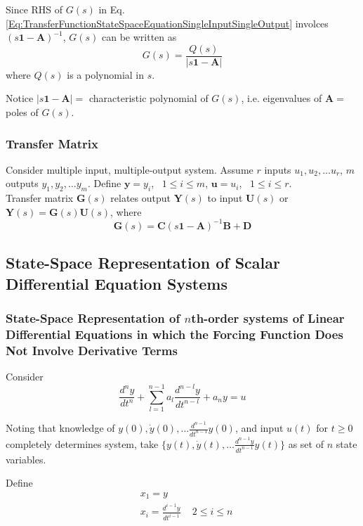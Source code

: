 \documentclass[10pt]{amsart}
\begin{document}
\begin{multicols*}{2}
Since RHS of $G(s)$ in Eq. \ref{Eq:TransferFunctionStateSpaceEquationSingleInputSingleOutput} involces $(s\mathbf{1} - \mathbf{A})^{-1}$, $G(s)$ can be written as 
\[
G(s) = \frac{Q(s)}{ |s\mathbf{1} - \mathbf{A} | } 
\]
where $Q(s)$ is a polynomial in $s$. 

Notice $|s\mathbf{1}- \mathbf{A}| = $ characteristic polynomial of $G(s)$, i.e. eigenvalues of $\mathbf{A} = $ poles of $G(s)$.

\subsubsection{Transfer Matrix}

Consider multiple input, multiple-output system. Assume $r$ inputs $u_1, u_2, \dots u_r$, $m$ outputs $y_1, y_2, \dots y_m$.  Define $\mathbf{y} = y_i$, \quad \, $1\leq i \leq m$, $\mathbf{u} = u_i$, \quad \, $1 \leq i \leq r$. \\

Transfer matrix $\mathbf{G}(s)$ relates output $\mathbf{Y}(s)$ to input $\mathbf{U}(s)$ or $\mathbf{Y}(s) = \mathbf{G}(s) \mathbf{U}(s)$, where
\begin{equation}
\mathbf{G}(s) = \mathbf{C} (s\mathbf{1} - \mathbf{A})^{-1} \mathbf{B} + \mathbf{D}
\end{equation}

\subsection{State-Space Representation of Scalar Differential Equation Systems}

\subsubsection{State-Space Representation of $n$th-order systems of Linear Differential Equations in which the Forcing Function Does Not Involve Derivative Terms}

Consider 
\begin{equation}
\frac{d^ny}{dt^n} + \sum_{l=1}^{n-1} a_l \frac{d^{n-l} y}{dt^{n-l} } + a_n y = u
\end{equation}

Noting that knowledge of $y(0), \dot{y}(0), \dots \frac{d^{n-1}}{dt^{n-1}} y(0)$, and input $u(t)$ for $t\geq 0$ completely determines system, take $\lbrace y(t), \dot{y}(t), \dots \frac{d^{n-1}y }{dt^{n-1}} y(t) \rbrace$ as set of $n$ state variables.

Define 
\begin{equation}
\begin{aligned}
& x_1 =y  \\
& x_i = \frac{d^{i-1}y }{dt^{i-1}} \quad \, 2 \leq i \leq n
\end{aligned}
\end{equation}


\end{multicols*}
\end{document}

